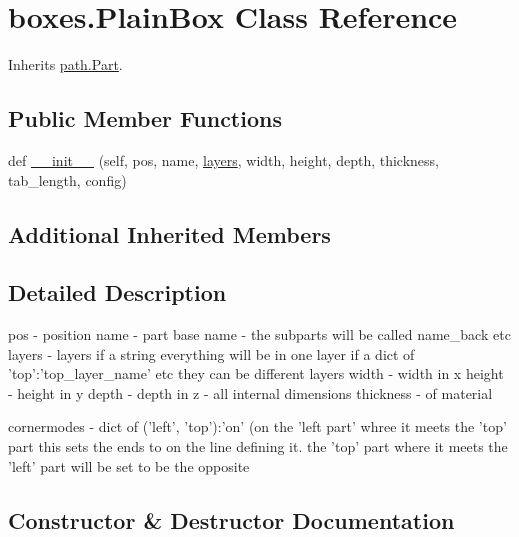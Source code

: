 \hypertarget{classboxes_1_1_plain_box}{}\section{boxes.\+Plain\+Box Class Reference}
\label{classboxes_1_1_plain_box}


Inherits \hyperlink{classpath_1_1_part}{path.\+Part}.

\subsection*{Public Member Functions}
\begin{DoxyCompactItemize}
\item 
def \hyperlink{classboxes_1_1_plain_box_a9402a6371c8a944c3d0960e9141d00b7}{\+\_\+\+\_\+init\+\_\+\+\_\+} (self, pos, name, \hyperlink{classpath_1_1_part_adcfeed4d6166f35e3ea1eb87926f6a5e}{layers}, width, height, depth, thickness, tab\+\_\+length, config)
\end{DoxyCompactItemize}
\subsection*{Additional Inherited Members}


\subsection{Detailed Description}
\begin{DoxyVerb}pos       - position
   name      - part base name - the subparts will be called name_back etc
   layers    - layers if a string everything will be in one layer if a dict of 'top':'top_layer_name' etc they can be different layers
   width     - width in x 
   height    - height in y
   depth     - depth in z 
         - all internal dimensions
   thickness - of material

   cornermodes - dict of ('left', 'top'):'on' (on the 'left part' whree it meets the 'top' part this sets the ends to on the line defining it. the 'top' part where it meets the 'left' part will be set to be the opposite
\end{DoxyVerb}
 

\subsection{Constructor \& Destructor Documentation}
\hypertarget{classboxes_1_1_plain_box_a9402a6371c8a944c3d0960e9141d00b7}{}
